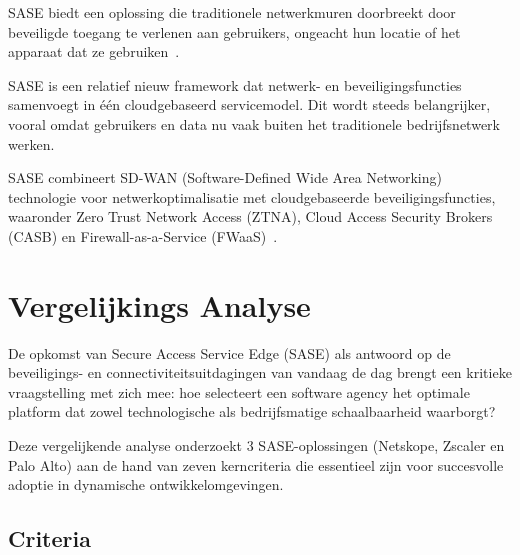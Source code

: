 \vspace{2ex}

SASE biedt een oplossing die traditionele netwerkmuren doorbreekt door beveiligde toegang te verlenen aan gebruikers, ongeacht hun locatie of het apparaat dat ze gebruiken~\autocite{KPN2023}.

\vspace{2ex}

SASE is een relatief nieuw framework dat netwerk- en beveiligingsfuncties samenvoegt in één cloudgebaseerd servicemodel. Dit wordt steeds belangrijker, vooral omdat gebruikers en data nu vaak buiten het traditionele bedrijfsnetwerk werken. 

\vspace{2ex}

SASE combineert SD-WAN (Software-Defined Wide Area Networking) technologie voor netwerkoptimalisatie met cloudgebaseerde beveiligingsfuncties, waaronder Zero Trust Network Access (ZTNA), Cloud Access Security Brokers (CASB) en Firewall-as-a-Service (FWaaS)~\autocite{ZPE2025}.

\section{Vergelijkings Analyse}
De opkomst van Secure Access Service Edge (SASE) als antwoord op de beveiligings- en connectiviteitsuitdagingen van vandaag de dag brengt een kritieke vraagstelling met zich mee: hoe selecteert een software agency het optimale platform dat zowel technologische als bedrijfsmatige schaalbaarheid waarborgt? 

\vspace{2ex}

Deze vergelijkende analyse onderzoekt 3 SASE-oplossingen (Netskope, Zscaler en Palo Alto) aan de hand van zeven kerncriteria die essentieel zijn voor succesvolle adoptie in dynamische ontwikkelomgevingen.

\subsection{Criteria}

